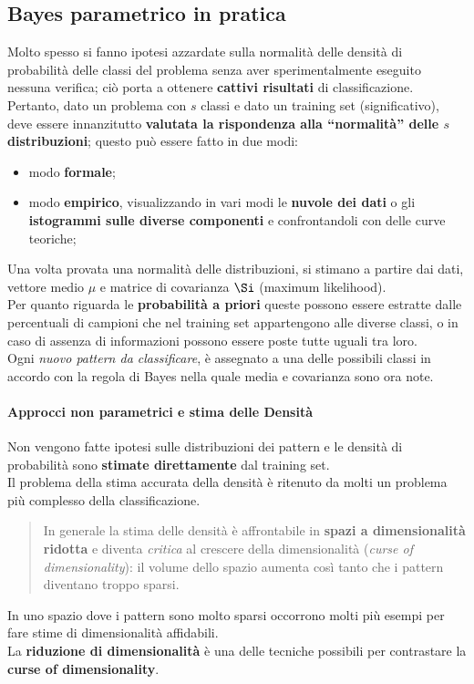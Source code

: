 \subsection{Bayes parametrico in pratica}\label{sec:bayes_parametrico_in_pratica} %
Molto spesso si fanno ipotesi azzardate sulla normalità delle densità di probabilità delle classi del problema senza aver sperimentalmente eseguito nessuna verifica; ciò porta a ottenere \textbf{cattivi risultati} di classificazione.
\\
Pertanto, dato un problema con $s$ classi e dato un training set (significativo), deve essere innanzitutto \textbf{valutata la rispondenza alla ``normalità'' delle $s$ distribuzioni}; questo può essere fatto in due modi:
\begin{itemize}
    \item modo \textbf{formale};
    \item modo \textbf{empirico}, visualizzando in vari modi le \textbf{nuvole dei dati} o gli \textbf{istogrammi sulle diverse componenti} e confrontandoli con delle curve teoriche;
\end{itemize}
Una volta provata una normalità delle distribuzioni, si stimano a partire dai dati, vettore medio $\mu$ e matrice di covarianza $\Si$ (maximum likelihood).
\\
Per quanto riguarda le \textbf{probabilità a priori} queste possono essere estratte dalle percentuali di campioni che nel training set appartengono alle diverse classi, o in caso di assenza di informazioni possono essere poste tutte uguali tra loro.
\\
Ogni \textit{nuovo pattern da classificare}, è assegnato a una delle possibili classi in accordo con la regola di Bayes nella quale media e covarianza sono ora note.
\paragraph{Approcci non parametrici e stima delle Densità}\label{par:approcci_non_parametrici_e_stima_delle_densita} %
Non vengono fatte ipotesi sulle distribuzioni dei pattern e le densità di probabilità sono \textbf{stimate direttamente} dal training set.
\\
Il problema della stima accurata della densità è ritenuto da molti un problema più complesso della classificazione.
\begin{quote}
    In generale la stima delle densità è affrontabile in \textbf{spazi a dimensionalità ridotta} e diventa \textit{critica} al crescere della dimensionalità (\textit{curse of dimensionality}): il volume dello spazio aumenta così tanto che i pattern diventano troppo sparsi.
\end{quote}
\begin{critical}
    In uno spazio dove i pattern sono molto sparsi occorrono molti più esempi per fare stime di dimensionalità affidabili.
    \\
    La \textbf{riduzione di dimensionalità} è una delle tecniche possibili per contrastare la \textbf{curse of dimensionality}.
\end{critical}
%
